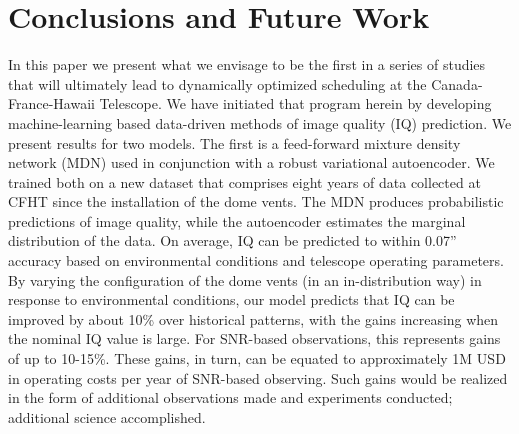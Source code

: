 \section{Conclusions and Future Work} \label{sec:conclusion}

\iffalse
\begin{figure*}
\begin{subfigure}{0.49\textwidth}
    \centering
    \texttt{[image: figures/sigma\_al\_vs\_mll.pdf]}
    \caption{Aleatoric uncertainty ($68\%$ spread) v/s pseudo MLL. Vertical line is the $95^{\rm th}$ percentile value of the pseudo MLL histogram.}
    \label{fig:alvsmll}
\end{subfigure}
\hfill
\begin{subfigure}{0.49\textwidth}
    \centering
    \texttt{[image: figures/sigma\_epis\_vs\_mll.pdf]}
    \caption{Epistemic uncertainty ($68\%$ spread) v/s pseudo MLL. Vertical line is the $95^{\rm th}$ percentile value of the pseudo MLL histogram.}
    \label{fig:episvsmll}
\end{subfigure}
\caption{For one of the 10 separate test sets, uncertainty from the mixture density network is plotted against the pseudo marginal log likelihood from the robust variational autoencoder. On the x-axis, greater is better. By and large, there is a 1:1 correspondence between each uncertainty and MLL}
\label{fig:sigma_vs_mll}
\end{figure*}
\fi

In this paper we present what we envisage to be the first in a series of studies that will ultimately lead to dynamically optimized scheduling at the Canada-France-Hawaii Telescope. We have initiated that program herein by developing machine-learning based data-driven methods of image quality (IQ) prediction.  
We present results for two models.  The first is a feed-forward mixture density network (MDN) used in conjunction with a robust variational autoencoder. We trained both on a new dataset that comprises eight years of data collected at CFHT since the installation of the dome vents.  The MDN produces probabilistic predictions of image quality, while the autoencoder estimates the marginal distribution of the data. On average, IQ can be predicted to within 0.07'' accuracy based on environmental conditions and telescope operating parameters. By varying the configuration of the dome vents (in an in-distribution way) in response to environmental conditions, our model predicts that IQ can be improved by about 10\% over historical patterns, with the gains increasing when the nominal IQ value is large. For SNR-based observations, this represents gains of up to 10-15\%.  These gains, in turn, can be equated to  approximately 1M USD in operating costs per year of SNR-based observing.  Such gains would be realized in the form of additional observations made and experiments conducted; additional science accomplished.

